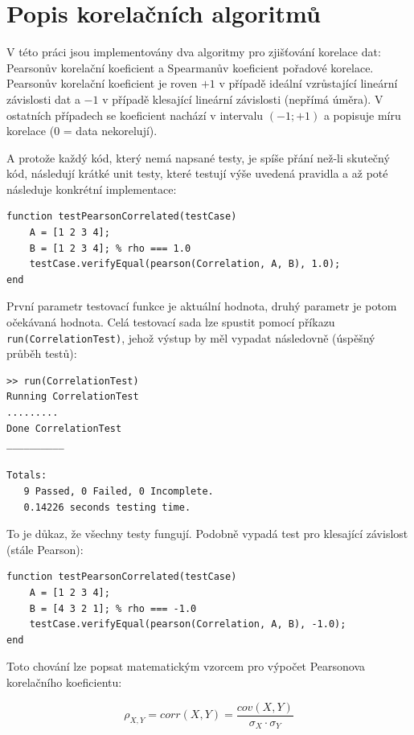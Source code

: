 \section*{Popis korelačních algoritmů}
V této práci jsou implementovány dva algoritmy pro zjišťování korelace dat: Pearsonův korelační koeficient a Spearmanův koeficient pořadové korelace. Pearsonův korelační koeficient je roven $+1$ v případě ideální vzrůstající lineární závislosti dat a $-1$ v případě klesající lineární závislosti (nepřímá úměra). V ostatních případech se koeficient nachází v intervalu $(-1;+1)$ a popisuje míru korelace ($0$ = data nekorelují).

A protože každý kód, který nemá napsané testy, je spíše přání než-li skutečný kód, následují krátké unit testy, které testují výše uvedená pravidla a až poté následuje konkrétní implementace:

\begin{verbatim}
function testPearsonCorrelated(testCase)
    A = [1 2 3 4];
    B = [1 2 3 4]; % rho === 1.0
    testCase.verifyEqual(pearson(Correlation, A, B), 1.0);
end
\end{verbatim}

První parametr testovací funkce je aktuální hodnota, druhý parametr je potom očekávaná hodnota. Celá testovací sada lze spustit pomocí příkazu \texttt{run(CorrelationTest)}, jehož výstup by měl vypadat následovně (úspěšný průběh testů):

\begin{verbatim}
>> run(CorrelationTest)
Running CorrelationTest
.........
Done CorrelationTest
__________

Totals:
   9 Passed, 0 Failed, 0 Incomplete.
   0.14226 seconds testing time.
\end{verbatim}

To je důkaz, že všechny testy fungují. Podobně vypadá test pro klesající závislost (stále Pearson):

\begin{verbatim}
function testPearsonCorrelated(testCase)
    A = [1 2 3 4];
    B = [4 3 2 1]; % rho === -1.0
    testCase.verifyEqual(pearson(Correlation, A, B), -1.0);
end
\end{verbatim}

Toto chování lze popsat matematickým vzorcem pro výpočet Pearsonova korelačního koeficientu:

\begin{equation}
\rho_{X,Y} = corr(X,Y) = \frac{cov(X,Y)}{\sigma_X \cdot \sigma_Y}
\end{equation}


